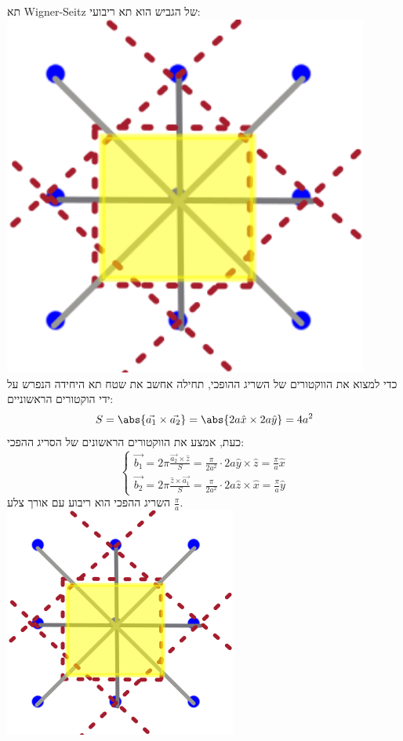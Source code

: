 \documentclass{article}
\begin{document}
\begin{Question}
תא Wigner-Seitz של הגביש הוא תא ריבועי:\\
\includegraphics[width=0.9\textwidth]{image/Q73.png}\\
כדי למצוא את הווקטורים של השריג ההופכי, תחילה אחשב את שטח תא היחידה הנפרש על ידי הוקטורים הראשוניים:
$$S=\abs{\vec{a_{1}}\times \vec{a_{2}}}=\abs{2a\hat{x}\times 2a\hat{y}}=4a^{2}
$$
כעת, אמצע את הווקטורים הראשונים של הסריג ההפכי:
$$\begin{cases}
    \vec{b_{1}}=2\pi\frac{\vec{a_{2}}\times\hat{z}}{S}=\frac{\pi}{2a^{2}}\cdot2a\hat{y}\times\hat{z}=\frac{\pi}{a}\hat{x}\\
    \vec{b_{2}}=2\pi\frac{\hat{z}\times\vec{a_{1}}}{S}=\frac{\pi}{2a^{2}}\cdot2a\hat{z}\times\hat{x}=\frac{\pi}{a}\hat{y}
\end{cases}
$$
השריג ההפכי הוא ריבוע עם אורך צלע $\frac{\pi}{a}$.\\
\includegraphics[]{image/Q73.png}\\

\end{Question}
\end{document}
